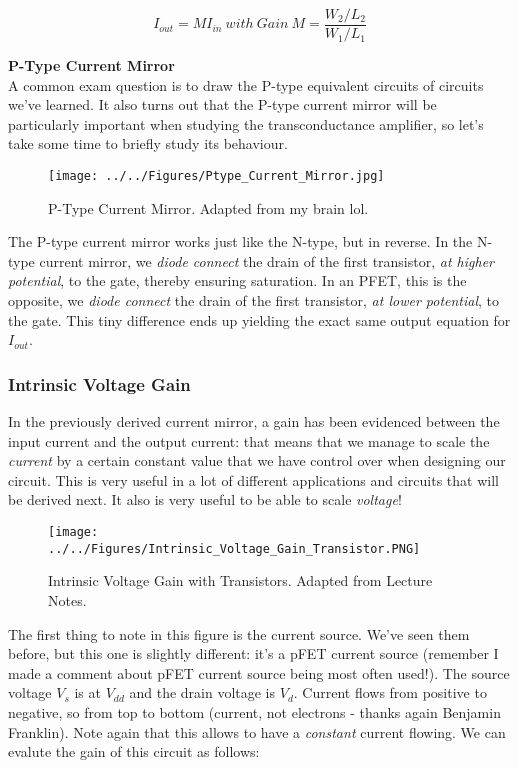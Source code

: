 \begin{equation}
I_{out} = M I_{in} \ with \ Gain \ M = \frac{W_2/L_2}{W_1/L_1}
\end{equation}

\textbf{P-Type Current Mirror} \\

A common exam question is to draw the P-type equivalent circuits of circuits we've learned. It also turns out that the P-type current mirror will be particularly important when studying the transconductance amplifier, so let's take some time to briefly study its behaviour.   

\begin{figure}[H]
    \centering
    \texttt{[image: ../../Figures/Ptype\_Current\_Mirror.jpg]}
    \caption{P-Type Current Mirror. Adapted from my brain lol.}
    \label{fig:N-Type Current Mirror}   
\end{figure}

The P-type current mirror works just like the N-type, but in reverse. In the N-type current mirror, we \textit{diode connect} the drain of the first transistor, \textit{at higher potential}, to the gate, thereby ensuring saturation. In an PFET, this is the opposite, we \textit{diode connect} the drain of the first transistor, \textit{at lower potential}, to the gate. This tiny difference ends up yielding the exact same output equation for $I_{out}$. 

\subsubsection{Intrinsic Voltage Gain}

In the previously derived current mirror, a gain has been evidenced between the input current and the output current: that means that we manage to scale the \textit{current} by a certain constant value that we have control over when designing our circuit. This is very useful in a lot of different applications and circuits that will be derived next. It also is very useful to be able to scale \textit{voltage}!

\begin{figure}[H]
    \centering
    \texttt{[image: ../../Figures/Intrinsic\_Voltage\_Gain\_Transistor.PNG]}
    \caption{Intrinsic Voltage Gain with Transistors. Adapted from Lecture Notes.}
    \label{fig:basalandcerebellum}
\end{figure}

The first thing to note in this figure is the current source. We've seen them before, but this one is slightly different: it's a pFET current source (remember I made a comment about pFET current source being most often used!). The source voltage $V_s$ is at $V_{dd}$ and the drain voltage is $V_d$. Current flows from positive to negative, so from top to bottom (current, not electrons - thanks again Benjamin Franklin). Note again that this allows to have a \emph{constant} current flowing. We can evalute the gain of this circuit as follows: 

